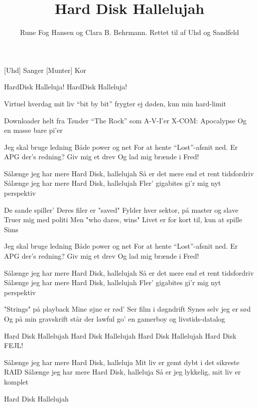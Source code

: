 \documentclass[a4paper,11pt]{article}
\title{Hard Disk Hallelujah}
\author{Rune Fog Hansen og Clara B. Behrmann. Rettet til af Uhd og
Sandfeld}
\begin{document}
\maketitle

\begin{roles}
[Uhd] Sanger       
[Munter] Kor
\end{roles}

\begin{props}
\prop{}
\end{props}


\begin{song}
HardDisk Halleluja!
HardDisk Halleluja!

Virtuel hverdag
mit liv ``bit by bit''                      
frygter ej døden, kun min hard-limit    

Downloader helt fra Tønder     
``The Rock'' som A-V-I'er         
X-COM: Apocalypse               
Og en masse bare pi'er

Jeg skal bruge ledning 
Både power og net               
For at hente ``Lost''-afsnit ned.   
Er APG der's redning?
Giv mig et drev
Og lad mig brænde i Fred!

Sålænge jeg har mere Hard Disk, hallelujah
Så er det mere end et rent tidsfordriv
Sålænge jeg har mere Hard Disk, hallelujah
Fler' gigabites gi'r mig nyt perspektiv

De sande spiller'
Deres filer er "saved"                  
Fylder hver sektor, på master og slave
Truer mig med politi                
Men "who dares, wins"
Livet er for kort til, kun at spille Sims                  

Jeg skal bruge ledning 
Både power og net               
For at hente ``Lost''-afsnit ned.   
Er APG der's redning?
Giv mig et drev
Og lad mig brænde i Fred!

Sålænge jeg har mere Hard Disk, hallelujah
Så er det mere end et rent tidsfordriv
Sålænge jeg har mere Hard Disk, hallelujah
Fler' gigabites gi'r mig nyt perspektiv

"Strings" på playback
Mine øjne er rød'
Ser film i døgndrift
Synes selv jeg er sød
Og på min gravskrift
står der lawful go'
en gamerboy og livstids-datalog


Hard Disk Hallelujah
Hard Disk Hallelujah
Hard Disk Hallelujah
Hard Disk FEJL!

 Sålænge jeg har mere Hard Disk, halleluja
Mit liv er gemt dybt i det sikreste RAID
Sålænge jeg har mere Hard Disk, halleluja
Så er jeg lykkelig, mit liv er komplet

Hard Disk Hallelujah


\end{song}
\end{document}
